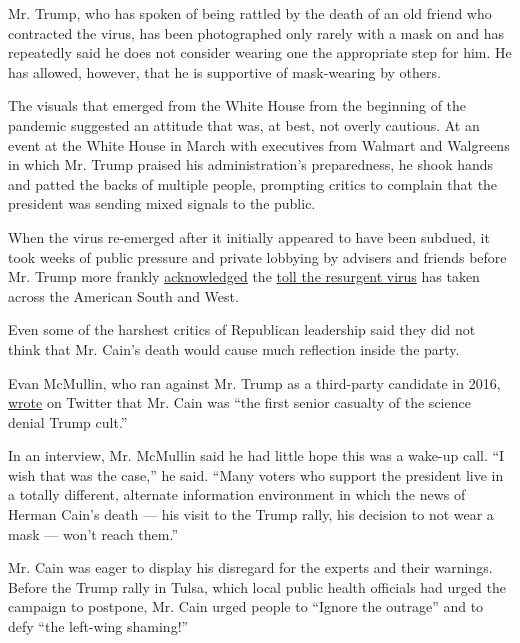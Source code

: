 Mr. Trump, who has spoken of being rattled by the death of an old friend
who contracted the virus, has been photographed only rarely with a mask
on and has repeatedly said he does not consider wearing one the
appropriate step for him. He has allowed, however, that he is supportive
of mask-wearing by others.

The visuals that emerged from the White House from the beginning of the
pandemic suggested an attitude that was, at best, not overly cautious.
At an event at the White House in March with executives from Walmart and
Walgreens in which Mr. Trump praised his administration's preparedness,
he shook hands and patted the backs of multiple people, prompting
critics to complain that the president was sending mixed signals to the
public.

When the virus re-emerged after it initially appeared to have been
subdued, it took weeks of public pressure and private lobbying by
advisers and friends before Mr. Trump more frankly
\href{https://www.nytimes.com/2020/07/20/us/politics/trump-coronavirus-briefings.html}{acknowledged}
the
\href{https://www.nytimes.com/interactive/2020/us/coronavirus-us-cases.html}{toll
the resurgent virus} has taken across the American South and West.

Even some of the harshest critics of Republican leadership said they did
not think that Mr. Cain's death would cause much reflection inside the
party.

Evan McMullin, who ran against Mr. Trump as a third-party candidate in
2016,
\href{https://twitter.com/EvanMcMullin/status/1288849392754143234?ref_src=twsrc\%5Etfw\%7Ctwcamp\%5Etweetembed\%7Ctwterm\%5E1288849392754143234\%7Ctwgr\%5E\&ref_url=https\%3A\%2F\%2Fwww.breitbart.com\%2F2020-election\%2F2020\%2F07\%2F30\%2Fnever-trumps-evan-mcmullin-blames-trump-cult-for-herman-cain-death\%2F}{wrote}
on Twitter that Mr. Cain was ``the first senior casualty of the science
denial Trump cult.''

In an interview, Mr. McMullin said he had little hope this was a wake-up
call. ``I wish that was the case,'' he said. ``Many voters who support
the president live in a totally different, alternate information
environment in which the news of Herman Cain's death --- his visit to
the Trump rally, his decision to not wear a mask --- won't reach them.''

Mr. Cain was eager to display his disregard for the experts and their
warnings. Before the Trump rally in Tulsa, which local public health
officials had urged the campaign to postpone, Mr. Cain urged people to
``Ignore the outrage'' and to defy ``the left-wing shaming!''

